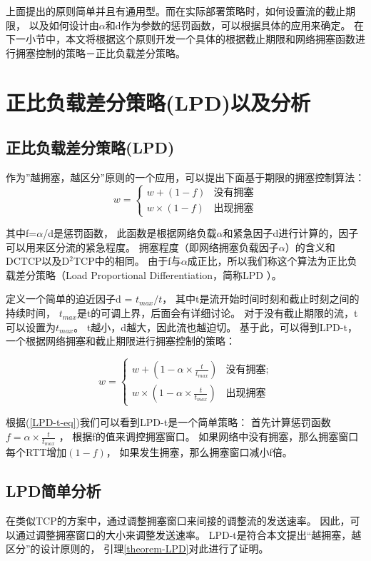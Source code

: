 上面提出的原则简单并且有通用型。而在实际部署策略时，如何设置流的截止期限，
以及如何设计由$\alpha$和d作为参数的惩罚函数，可以根据具体的应用来确定。 
在下一小节中，本文将根据这个原则开发一个具体的根据截止期限和网络拥塞函数进行拥塞控制的策略－正比负载差分策略。

\section{正比负载差分策略(LPD)以及分析}
\label{sec_LPD:LPD}

\subsection{正比负载差分策略(LPD)}
作为”越拥塞，越区分”原则的一个应用，可以提出下面基于期限的拥塞控制算法：
\begin{equation}
w=
\begin{cases}
w+(1-f) &\text{没有拥塞}\\
w \times (1-f) &\text{出现拥塞}
\end{cases}
\label{LPD-CA-eq}
\end{equation}


其中f=$\alpha$/d是惩罚函数，
此函数是根据网络负载$\alpha$和紧急因子d进行计算的，因子可以用来区分流的紧急程度。
拥塞程度（即网络拥塞负载因子$\alpha$）的含义和DCTCP以及D$^2$TCP中的相同\cite{DCTCP, D2TCP}。 
由于f与$\alpha$成正比，所以我们称这个算法为正比负载差分策略（Load Proportional Differentiation，简称LPD ）。 

定义一个简单的迫近因子d = $t_{max}/t$，
其中t是流开始时间时刻和截止时刻之间的持续时间，
$t_{max}$是t的可调上界，后面会有详细讨论。
对于没有截止期限的流，t可以设置为$t_{max}$。 
t越小，d越大，因此流也越迫切。
基于此，可以得到LPD-t，一个根据网络拥塞和截止期限进行拥塞控制的策略：

\begin{equation}
w=
\begin{cases}
w+(1-\alpha \times \frac{t}{t_{max}}) &\text{没有拥塞;}\\
w \times (1-\alpha \times \frac{t}{t_{max}}) &\text{出现拥塞}
\end{cases}
\label{LPD-t-eq}
\end{equation}


根据(\ref{LPD-t-eq})我们可以看到LPD-t是一个简单策略：
首先计算惩罚函数$f=\alpha \times \frac{t}{t_{max}}$ ，
根据f的值来调控拥塞窗口。
如果网络中没有拥塞，那么拥塞窗口每个RTT增加$(1-f)$，
如果发生拥塞，那么拥塞窗口减小f倍。
 
\subsection{LPD简单分析}
在类似TCP的方案中，通过调整拥塞窗口来间接的调整流的发送速率。
因此，可以通过调整拥塞窗口的大小来调整发送速率。
LPD-t是符合本文提出“越拥塞，越区分”的设计原则的，
引理\ref{theorem-LPD}对此进行了证明。
 
